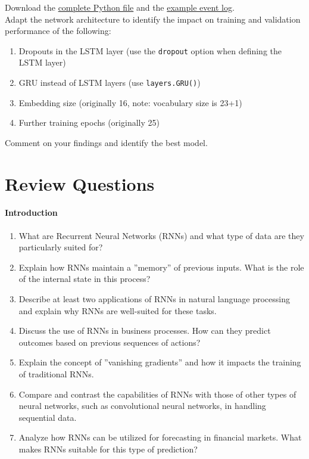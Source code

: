 \begin{withcode}
\begin{exerciseboxcomputer}

Download the \href{https://github.com/jevermann/busi4720-ml/blob/main/process_prediction.py}{complete Python file} and the \href{https://evermann.ca/busi4720/BPI_Challenge_2012.xes.gz}{example event log}. \\

Adapt the network architecture to identify the impact on training and validation performance of the following:
   \begin{enumerate}
      \item Dropouts in the LSTM layer (use the \texttt{dropout} option when defining the LSTM layer)
      \item GRU instead of LSTM layers (use \texttt{layers.GRU()})
      \item Embedding size (originally 16, note: vocabulary size is 23+1)
      \item Further training epochs (originally 25)
   \end{enumerate}
Comment on your findings and identify the best model. \\
\end{exerciseboxcomputer}
\end{withcode}

\section{Review Questions}
\paragraph*{Introduction}
\begin{enumerate}[nosep]
	\item What are Recurrent Neural Networks (RNNs) and what type of data are they particularly suited for?
	\item Explain how RNNs maintain a ''memory'' of previous inputs. What is the role of the internal state in this process?
	\item Describe at least two applications of RNNs in natural language processing and explain why RNNs are well-suited for these tasks.
	\item Discuss the use of RNNs in business processes. How can they predict outcomes based on previous sequences of actions?
	\item Explain the concept of ''vanishing gradients'' and how it impacts the training of traditional RNNs.
	\item Compare and contrast the capabilities of RNNs with those of other types of neural networks, such as convolutional neural networks, in handling sequential data.
	\item Analyze how RNNs can be utilized for forecasting in financial markets. What makes RNNs suitable for this type of prediction?
\end{enumerate}

